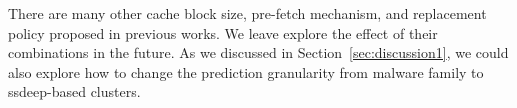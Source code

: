 There are many other cache block size, pre-fetch mechanism, and replacement policy proposed in previous works. 
We leave explore the effect of their combinations in the future. 
As we discussed in Section~\ref{sec:discussion1}, 
we could also explore how to change the prediction granularity from malware family to ssdeep-based clusters. 
